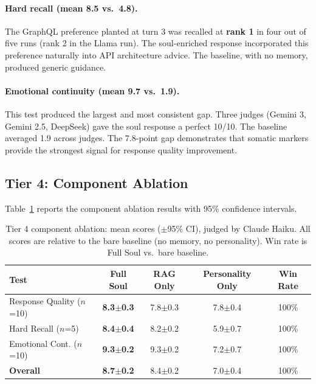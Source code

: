 \documentclass{article}
\begin{document}
\paragraph{Hard recall (mean 8.5 vs.\ 4.8).} The GraphQL preference planted at turn 3 was recalled at \textbf{rank 1} in four out of five runs (rank 2 in the Llama run). The soul-enriched response incorporated this preference naturally into API architecture advice. The baseline, with no memory, produced generic guidance.

\paragraph{Emotional continuity (mean 9.7 vs.\ 1.9).} This test produced the largest and most consistent gap. Three judges (Gemini 3, Gemini 2.5, DeepSeek) gave the soul response a perfect 10/10. The baseline averaged 1.9 across judges. The 7.8-point gap demonstrates that somatic markers provide the strongest signal for response quality improvement.

\subsection{Tier 4: Component Ablation}

Table~\ref{tab:ablation} reports the component ablation results with 95\% confidence intervals.

\begin{table}[h]
\centering
\small
\begin{tabular}{@{}lcccc@{}}
\toprule
\textbf{Test} & \textbf{Full Soul} & \textbf{RAG Only} & \textbf{Personality Only} & \textbf{Win Rate} \\
\midrule
Response Quality ($n$=10)   & \textbf{8.3$\pm$0.3} & 7.8$\pm$0.3 & 7.8$\pm$0.4 & 100\% \\
Hard Recall ($n$=5)         & \textbf{8.4$\pm$0.4} & 8.2$\pm$0.2 & 5.9$\pm$0.7 & 100\% \\
Emotional Cont. ($n$=10)    & \textbf{9.3$\pm$0.2} & 9.3$\pm$0.2 & 7.2$\pm$0.7 & 100\% \\
\midrule
\textbf{Overall}            & \textbf{8.7$\pm$0.2} & 8.4$\pm$0.2 & 7.0$\pm$0.4 & 100\% \\
\bottomrule
\end{tabular}
\caption{Tier 4 component ablation: mean scores ($\pm$95\% CI), judged by Claude Haiku. All scores are relative to the bare baseline (no memory, no personality). Win rate is Full Soul vs.\ bare baseline.}
\label{tab:ablation}
\end{table}
\end{document}
